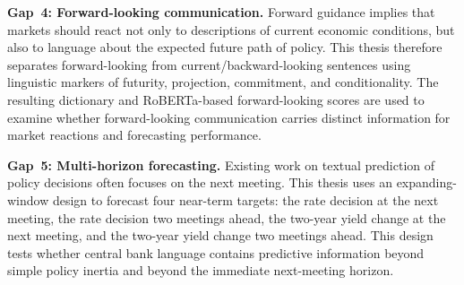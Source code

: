 \textbf{Gap~4: Forward-looking communication.} Forward guidance implies
that markets should react not only to descriptions of current economic
conditions, but also to language about the expected future path of
policy. This thesis therefore separates forward-looking from
current/backward-looking sentences using linguistic markers of futurity,
projection, commitment, and conditionality. The resulting dictionary and
RoBERTa-based forward-looking scores are used to examine whether
forward-looking communication carries distinct information for market
reactions and forecasting performance.

\textbf{Gap~5: Multi-horizon forecasting.} Existing work on textual
prediction of policy decisions often focuses on the next meeting. This
thesis uses an expanding-window design to forecast four near-term
targets: the rate decision at the next meeting, the rate decision two
meetings ahead, the two-year yield change at the next meeting, and the
two-year yield change two meetings ahead. This design tests whether
central bank language contains predictive information beyond simple
policy inertia and beyond the immediate next-meeting horizon.